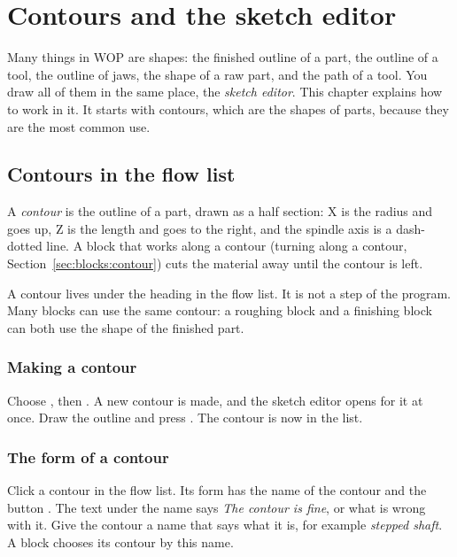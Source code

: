\chapter{Contours and the sketch editor}\label{ch:contours}

Many things in WOP are shapes: the finished outline of a part, the outline of a tool, the outline of jaws, the shape of a raw part, and the path of a tool. You draw all of them in the same place, the \emph{sketch editor}. This chapter explains how to work in it. It starts with contours, which are the shapes of parts, because they are the most common use.

\section{Contours in the flow list}\label{sec:sketch:contours}

A \emph{contour} is the outline of a part, drawn as a half section: X is the radius and goes up, Z is the length and goes to the right, and the spindle axis is a dash-dotted line. A block that works along a contour (turning along a contour, Section~\ref{sec:blocks:contour}) cuts the material away until the contour is left.

A contour lives under the heading  in the flow list. It is not a step of the program. Many blocks can use the same contour: a roughing block and a finishing block can both use the shape of the finished part.

\subsection{Making a contour}
Choose , then . A new contour is made, and the sketch editor opens for it at once. Draw the outline and press . The contour is now in the list.

\subsection{The form of a contour}
Click a contour in the flow list. Its form has the name of the contour and the button . The text under the name says \emph{The contour is fine}, or what is wrong with it. Give the contour a name that says what it is, for example \emph{stepped shaft}. A block chooses its contour by this name.


